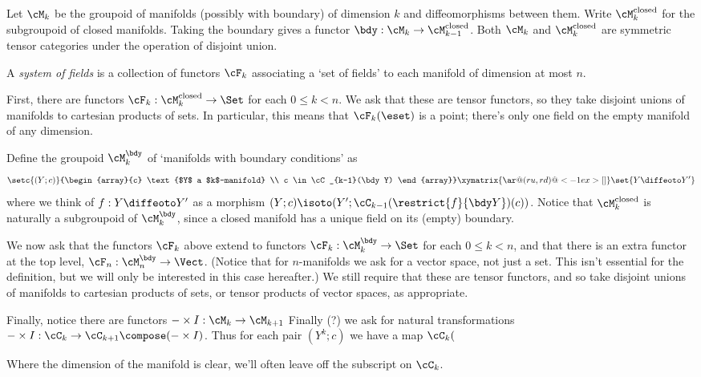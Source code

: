 

\newcommand{\manifolds}[1]{\cM_{#1}}
\newcommand{\closedManifolds}[1]{\cM_{#1}^{\text{closed}}}
\newcommand{\boundaryConditions}[1]{\cM_{#1}^{\bdy}}
Let $\manifolds{k}$ be the groupoid of manifolds (possibly with boundary) of dimension $k$ and diffeomorphisms between them. Write
$\closedManifolds{k}$ for the subgroupoid of closed manifolds. Taking the boundary gives a functor $\bdy : \manifolds{k} \to \closedManifolds{k-1}$.
Both $\manifolds{k}$ and $\closedManifolds{k}$ are symmetric tensor categories under the operation of disjoint union.
\begin{defn}
A \emph{system of fields} is a collection of functors $\cF_k$ associating a `set of fields' to each manifold of dimension at most $n$.

First, there are functors $\cF_k : \closedManifolds{k} \to \Set$ for each $0 \leq k < n$. We ask that these are tensor functors, so they
take disjoint unions of manifolds to cartesian products of sets. In particular, this means that $\cF_k(\eset)$ is a point; there's only one field
on the empty manifold of any dimension.

Define the groupoid $\boundaryConditions{k}$ of `manifolds with boundary conditions' as
\begin{equation*}
\setc{(Y; c)}{\begin{array}{c} \text{$Y$ a $k$-manifold} \\  c \in \cC_{k-1}(\bdy Y) \end{array}}
\xymatrix{ \ar@(ru,rd)@<-1ex>[]}
\set{Y \diffeoto Y'}
\end{equation*}
where we think of $f: Y \diffeoto Y'$ as a morphism $(Y; c) \isoto (Y'; \cC_{k-1}(\restrict{f}{\bdy Y})(c))$.
%
Notice that $\closedManifolds{k}$ is naturally a subgroupoid of $\boundaryConditions{k}$, since a closed manifold has a unique field on its (empty) boundary.

We now ask that the functors $\cF_k$ above extend to functors $\cF_k : \boundaryConditions{k} \to \Set$ for  each $0 \leq k < n$,
and that there is an extra functor at the top level, $\cF_n : \boundaryConditions{n} \to \Vect$. (Notice that for $n$-manifolds we ask for a vector space, not just a set. This isn't essential for the definition, but we will only be interested in this case hereafter.)
We still require that these are tensor functors, and so take disjoint unions of manifolds to cartesian products of sets, or tensor products of vector spaces, as appropriate.

Finally, notice there are functors $- \times I : \manifolds{k} \to \manifolds{k+1}$
Finally (?) we ask for natural transformations $- \times I : \cC_k \to \cC_{k+1} \compose (- \times I)$. Thus for each pair $(Y^k; c)$ we have a map $\cC_k($
\end{defn}
\begin{rem}
Where the dimension of the manifold is clear, we'll often leave off the subscript on $\cC_k$.
\end{rem}

